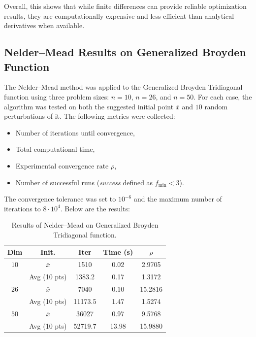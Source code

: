 \documentclass[a4paper,12pt]{article}
\begin{document}
	Overall, this shows that while finite differences can provide reliable optimization results, they are computationally expensive and less efficient than analytical derivatives when available.
	\newpage
	
	\subsection{Nelder–Mead Results on Generalized Broyden Function}
	
	The Nelder–Mead method was applied to the Generalized Broyden Tridiagonal function using three problem sizes: $n = 10$, $n = 26$, and $n = 50$. For each case, the algorithm was tested on both the suggested initial point $\bar{x}$ and $10$ random perturbations of it. The following metrics were collected:
	\begin{itemize}[noitemsep]
		\item Number of iterations until convergence,
		\item Total computational time,
		\item Experimental convergence rate $\rho$,
		\item Number of successful runs (\emph{success} defined as $f_{\min} < 3$).
	\end{itemize}
	
	The convergence tolerance was set to $10^{-6}$ and the maximum number of iterations to $8 \cdot 10^4$. Below are the results:
	
	\begin{table}[htbp]
		\centering
		\caption{Results of Nelder–Mead on Generalized Broyden Tridiagonal function.}
		\renewcommand{\arraystretch}{1.2}
		\begin{tabular}{|c|c|c|c|c|}
			\hline
			\textbf{Dim} & \textbf{Init.} & \textbf{Iter} & \textbf{Time (s)} & \textbf{$\rho$} \\
			\hline
			$10$   & $\bar{x}$       & 1510   & 0.02 & 2.9705 \\
			& Avg (10 pts)    & 1383.2 & 0.17 & 1.3172 \\
			\hline
			$26$   & $\bar{x}$       & 7040   & 0.10 & 15.2816 \\
			& Avg (10 pts)    & 11173.5 & 1.47 & 1.5274 \\
			\hline
			$50$   & $\bar{x}$       & 36027  & 0.97 & 9.5768 \\
			& Avg (10 pts)    & 52719.7 & 13.98 & 15.9880 \\
			\hline
		\end{tabular}
		\label{tab:neldermead_generalized_broyden}
	\end{table}
	
\end{document}
